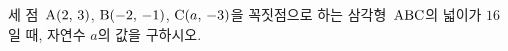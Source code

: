 세 점~$\mathrm{A}(2,\,3)$, $\mathrm{B}(-2,\,-1)$, $\mathrm{C}(a,\,-3)$을 꼭짓점으로 하는 삼각형~$\mathrm{ABC}$의 넓이가 $16$일 때, 자연수 $a$의 값을 구하시오.
